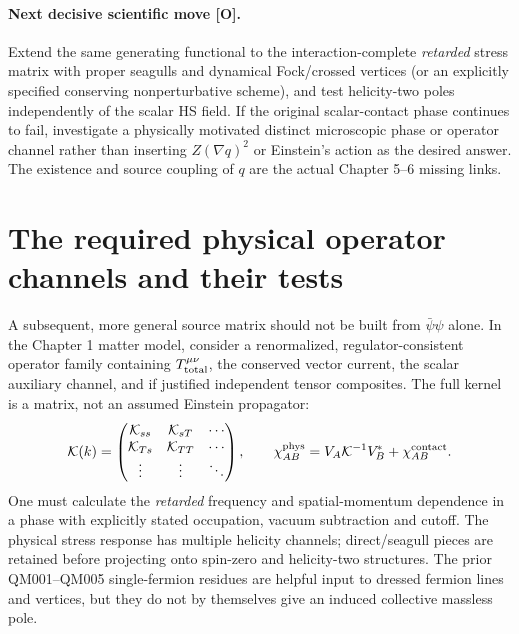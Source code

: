 \documentclass[11pt,a4paper]{article}
\begin{document}
\paragraph{Next decisive scientific move [O].} Extend the same generating functional to the interaction-complete \emph{retarded} stress matrix with proper seagulls and dynamical Fock/crossed vertices (or an explicitly specified conserving nonperturbative scheme), and test helicity-two poles independently of the scalar HS field. If the original scalar-contact phase continues to fail, investigate a physically motivated distinct microscopic phase or operator channel rather than inserting $Z(\nabla q)^2$ or Einstein's action as the desired answer. The existence and source coupling of $q$ are the actual Chapter 5--6 missing links.

\section{The required physical operator channels and their tests}
A subsequent, more general source matrix should not be built from $\bar\psi\psi$ alone. In the Chapter 1 matter model, consider a renormalized, regulator-consistent operator family containing $T^{\mu\nu}_{\rm total}$, the conserved vector current, the scalar auxiliary channel, and if justified independent tensor composites. The full kernel is a matrix, not an assumed Einstein propagator:
\begin{equation}\label{eq:matrix}
\mathcal K(k)=\begin{pmatrix}\mathcal K_{ss}&\mathcal K_{sT}&\cdots\\ \mathcal K_{Ts}&\mathcal K_{TT}&\cdots\\ \vdots&\vdots&\ddots\end{pmatrix},\qquad
\chi^{\rm phys}_{AB}=V_A\mathcal K^{-1}V_B^{\!*}+\chi_{AB}^{\rm contact}.
\end{equation}
One must calculate the \emph{retarded} frequency and spatial-momentum dependence in a phase with explicitly stated occupation, vacuum subtraction and cutoff. The physical stress response has multiple helicity channels; direct/seagull pieces are retained before projecting onto spin-zero and helicity-two structures. The prior QM001--QM005 single-fermion residues are helpful input to dressed fermion lines and vertices, but they do not by themselves give an induced collective massless pole.
\end{document}
